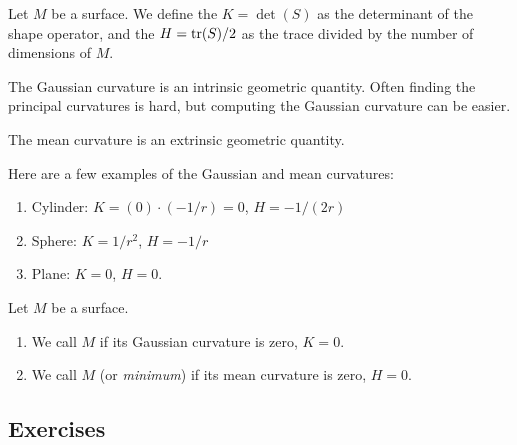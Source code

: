 \begin{definition}
Let $M$ be a surface. We define the 
$K=\det(S)$ as the determinant of the shape operator, and the
 $H=\mathop{\rm tr}\nolimits(S)/2$ as the trace divided by the number
of dimensions of $M$.
\end{definition}

\begin{remark}
The Gaussian curvature is an intrinsic geometric quantity. Often finding
the principal curvatures is hard, but computing the Gaussian curvature
can be easier.
\end{remark}

\begin{remark}
The mean curvature is an extrinsic geometric quantity.
\end{remark}

Here are a few examples of the Gaussian and mean curvatures:
\begin{enumerate}
\item Cylinder: $K = (0)\cdot(-1/r) = 0$, $H=-1/(2r)$
\item Sphere: $K = 1/r^{2}$, $H=-1/r$
\item Plane: $K=0$, $H=0$.
\end{enumerate}

\begin{definition}
  Let $M$ be a surface.
\begin{enumerate}
\item We call $M$  if its Gaussian curvature is zero, $K=0$.
\item We call $M$  (or \emph{minimum}) if its mean
  curvature is zero, $H=0$.
\end{enumerate}
\end{definition}





\subsection*{Exercises}



